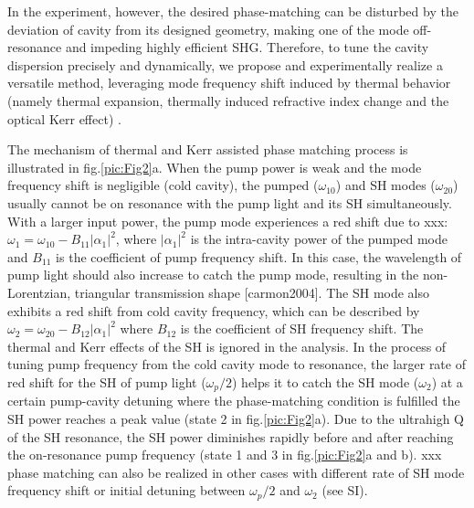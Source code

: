 \documentclass[a4paper,8pt,hyperref, twocolumn]{article}
\begin{document}
In the experiment, however, the desired phase-matching can be disturbed by the deviation of cavity from its designed geometry, making one of the mode off-resonance and impeding highly efficient SHG. 
Therefore, to tune the cavity dispersion precisely and dynamically, we propose and experimentally realize a versatile method, leveraging mode frequency shift induced by thermal behavior (namely thermal expansion, thermally induced refractive index change and the optical Kerr effect) \cite{del2011octave, herr2014temporal}.

The mechanism of thermal and Kerr assisted phase matching process is illustrated in fig.\ref{pic:Fig2}a. 
When the pump power is weak and the mode frequency shift is negligible (cold cavity), the pumped ($\omega_{10}$) and SH modes ($\omega_{20}$) usually cannot be on resonance with the pump light and its SH simultaneously. 
With a larger input power, the pump mode experiences a red shift due to xxx: $\omega_1 = \omega_{10}-B_{11}|\alpha_1|^2$, where $|\alpha_1|^2$ is the intra-cavity power of the pumped mode and $B_{11}$ is the coefficient of pump frequency shift. In this case, the wavelength of pump light should also increase to catch the pump mode, resulting in the non-Lorentzian, triangular transmission shape [carmon2004].
The SH mode also exhibits a red shift from cold cavity frequency, which can be described by $\omega_2 = \omega_{20}-B_{12}|\alpha_1|^2$ where $B_{12}$ is the coefficient of SH frequency shift. The thermal and Kerr effects of the SH is ignored in the analysis.
In the process of tuning pump frequency from the cold cavity mode to resonance, the larger rate of red shift for the SH of pump light ($\omega_p/2$) helps it to catch the SH mode ($\omega_2$) at a certain pump-cavity detuning  where the phase-matching condition is fulfilled the SH power reaches a peak value (state 2 in fig.\ref{pic:Fig2}a).
Due to the ultrahigh Q of the SH resonance, the SH power diminishes rapidly before and after reaching the on-resonance pump frequency (state 1 and 3 in fig.\ref{pic:Fig2}a and b). 
xxx phase matching can also be realized in other cases with different rate of SH mode frequency shift or initial detuning between $\omega_p/2$ and $\omega_2$ (see SI).
\end{document}
